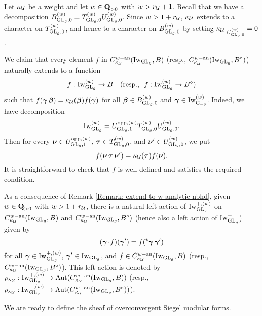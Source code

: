 \begin{Remark}\label{Remark: extend to w-analytic nbhd}
\normalfont Let $\kappa_{\calU}$ be a weight and let $w\in \Q_{>0}$ with $w>r_{\calU}+1$. Recall that we have a decomposition $B_{\GL_g, 0}^{(w)}=T_{\GL_g,0}^{(w)}U_{\GL_g,0}^{(w)}$. Since $w>1+r_{\calU}$, $\kappa_{\calU}$ extends to a character on $T_{\GL_g,0}^{(w)}$, and hence to a character on $B_{\GL_g,0}^{(w)}$ by setting $\kappa_{\calU}|_{U_{\GL_g,0}^{(w)}}=0$.

We claim that every element $f$ in $C^{w-\an}_{\kappa_{\calU}}(\Iw_{\GL_g}, B)$ (resp., $C^{w-\an}_{\kappa_{\calU}}(\Iw_{\GL_g}, B^{\circ})$) naturally extends to a function $$f:\Iw_{\GL_g}^{(w)}\rightarrow B\quad(\text{resp., }\,\,f:\Iw_{\GL_g}^{(w)}\rightarrow B^{\circ})$$ such that $f(\bfgamma\bfbeta)=\kappa_{\calU}(\bfbeta)f(\bfgamma)$ for all $\bfbeta\in B_{\GL_g, 0}^{(w)}$ and $\bfgamma\in \Iw_{\GL_g}^{(w)}$. Indeed, we have decomposition $$\Iw_{\GL_g}^{(w)}=U_{\GL_g, 1}^{\opp,(w)}T_{\GL_g,0}^{(w)}U_{\GL_g,0}^{(w)}.$$ Then for every $\bfnu\in U^{\opp,(w)}_{\GL_g,1}$, $\bftau\in T_{\GL_g,0}^{(w)}$, and $\bfnu'\in U_{\GL_g,0}^{(w)}$, we put $$f(\bfnu\bftau\bfnu')=\kappa_{\calU}(\bftau)f(\bfnu).$$ It is straightforward to check that $f$ is well-defined and satisfies the required condition. 
\end{Remark}

\begin{Definition}\label{Definition: strict Iwahori action on w-analytic representation for IwGL_g}
As a consequence of Remark \ref{Remark: extend to w-analytic nbhd}, given $w\in \Q_{>0}$ with $w>1+r_{\calU}$, there is a natural left action of $\Iw_{\GL_g}^{+, (w)}$ on $C^{w-\an}_{\kappa_{\calU}}(\Iw_{\GL_g}, B)$ and $C^{w-\an}_{\kappa_{\calU}}(\Iw_{\GL_g}, B^{\circ})$ (hence also a left action of $\Iw_{\GL_g}^+$) given by $$
    (\bfgamma\cdot f)(\bfgamma')=f(\trans\bfgamma\bfgamma')
$$
for all $\bfgamma\in \Iw^{+, (w)}_{\GL_g}$, $\bfgamma'\in \Iw_{\GL_g}$, and $f\in C^{w-\an}_{\kappa_{\calU}}(\Iw_{\GL_g}, B)$ (resp., $C^{w-\an}_{\kappa_{\calU}}(\Iw_{\GL_g}, B^{\circ})$). This left action is denoted by $\rho_{\kappa_{\calU}}: \Iw^{+,(w)}_{\GL_g}\rightarrow \Aut(C^{w-\an}_{\kappa_{\calU}}(\Iw_{\GL_g}, B))$ (resp., $\rho_{\kappa_{\calU}}: \Iw^{+,(w)}_{\GL_g}\rightarrow \Aut(C^{w-\an}_{\kappa_{\calU}}(\Iw_{\GL_g}, B^{\circ}))$).
\end{Definition}

We are ready to define the sheaf of overconvergent Siegel modular forms. 

